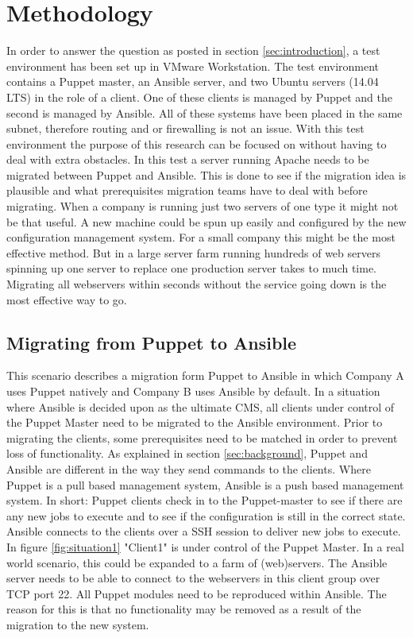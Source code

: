 \section{Methodology}\label{sec:methodology}
In order to answer the question as posted in section \ref{sec:introduction}, a test environment has been set up in VMware Workstation.  The test environment contains a Puppet master, an Ansible server, and two Ubuntu servers (14.04 LTS) in the role of a client. One of these clients is managed by Puppet and the second is managed by Ansible. All of these systems have been placed in the same subnet, therefore routing and or firewalling is not an issue. With this test environment the purpose of this research can be focused on without having to deal with extra obstacles. In this test a server running Apache needs to be migrated between Puppet and Ansible. This is done to see if the migration idea is plausible and what prerequisites migration teams have to deal with before migrating. When a company is running just two servers of one type it might not be that useful. A new machine could be spun up easily and configured by the new configuration management system. For a small company this might be the most effective method. But in a large server farm running hundreds of web servers spinning up one server to replace one production server takes to much time. Migrating all webservers within seconds without the service going down is the most effective way to go.  

\subsection{Migrating from Puppet to Ansible}\label{subsec:puppettoansible}
This scenario describes a migration form Puppet to Ansible in which Company A uses Puppet natively and Company B uses Ansible by default. In a situation where Ansible is decided upon as the ultimate CMS, all clients under control of the Puppet Master need to be migrated to the Ansible environment. Prior to migrating the clients, some prerequisites need to be matched in order to prevent loss of functionality. As explained in section \ref{sec:background}, Puppet and Ansible are different in the way they send commands to the clients. Where Puppet is a pull based management system, Ansible is a push based management system. In short: Puppet clients check in to the Puppet-master to see if there are any new jobs to execute and to see if the configuration is still in the correct state. Ansible connects to the clients over a SSH session to deliver new jobs to execute. In figure \ref{fig:situation1} "Client1" is under control of the Puppet Master. In a real world scenario, this could be expanded to a farm of (web)servers. The Ansible server needs to be able to connect to the webservers in this client group over TCP port 22. All Puppet modules need to be reproduced within Ansible. The reason for this is that no functionality may be removed as a result of the migration to the new system. 

